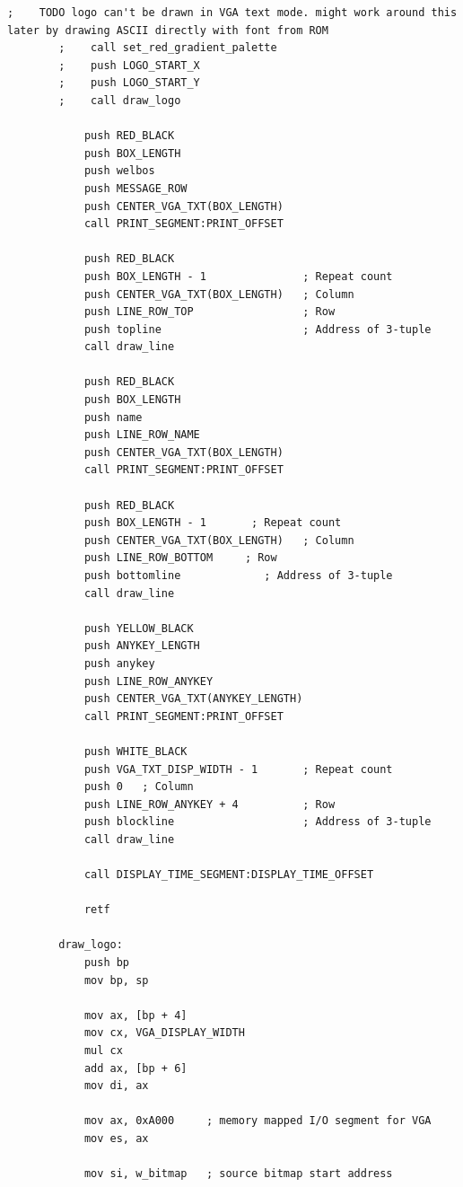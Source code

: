 \documentclass{article}
\begin{document}
\begin{lstlisting}[caption={loaderV04.asm listing}, captionpos=t]
        ;    TODO logo can't be drawn in VGA text mode. might work around this later by drawing ASCII directly with font from ROM
        ;    call set_red_gradient_palette
        ;    push LOGO_START_X
        ;    push LOGO_START_Y
        ;    call draw_logo

            push RED_BLACK
            push BOX_LENGTH
            push welbos
            push MESSAGE_ROW
            push CENTER_VGA_TXT(BOX_LENGTH)
            call PRINT_SEGMENT:PRINT_OFFSET

            push RED_BLACK
            push BOX_LENGTH - 1               ; Repeat count
            push CENTER_VGA_TXT(BOX_LENGTH)   ; Column
            push LINE_ROW_TOP                 ; Row
            push topline                      ; Address of 3-tuple
            call draw_line

            push RED_BLACK
            push BOX_LENGTH
            push name
            push LINE_ROW_NAME
            push CENTER_VGA_TXT(BOX_LENGTH)
            call PRINT_SEGMENT:PRINT_OFFSET

            push RED_BLACK
            push BOX_LENGTH - 1       ; Repeat count
            push CENTER_VGA_TXT(BOX_LENGTH)   ; Column
            push LINE_ROW_BOTTOM     ; Row
            push bottomline             ; Address of 3-tuple
            call draw_line

            push YELLOW_BLACK
            push ANYKEY_LENGTH
            push anykey
            push LINE_ROW_ANYKEY
            push CENTER_VGA_TXT(ANYKEY_LENGTH)
            call PRINT_SEGMENT:PRINT_OFFSET

            push WHITE_BLACK
            push VGA_TXT_DISP_WIDTH - 1       ; Repeat count
            push 0   ; Column
            push LINE_ROW_ANYKEY + 4          ; Row
            push blockline                    ; Address of 3-tuple
            call draw_line

            call DISPLAY_TIME_SEGMENT:DISPLAY_TIME_OFFSET

            retf

        draw_logo:
            push bp
            mov bp, sp

            mov ax, [bp + 4]
            mov cx, VGA_DISPLAY_WIDTH
            mul cx
            add ax, [bp + 6]
            mov di, ax

            mov ax, 0xA000     ; memory mapped I/O segment for VGA
            mov es, ax

            mov si, w_bitmap   ; source bitmap start address


\end{lstlisting}
\end{document}
